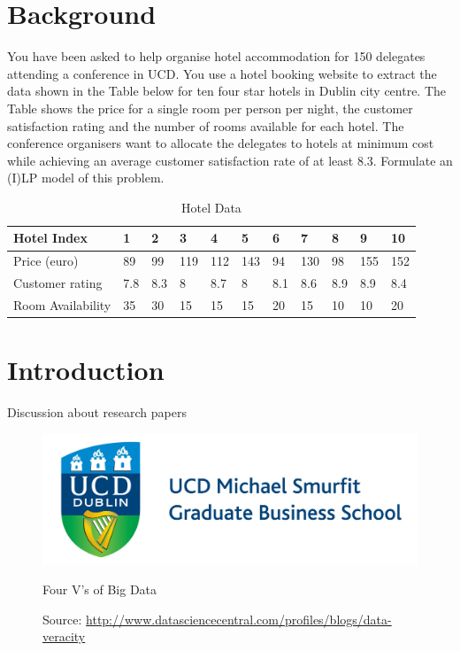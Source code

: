 \documentclass[paper=a4, fontsize=11pt]{scrartcl} %
\begin{document}
\section{Background}
You have been asked to help organise hotel accommodation for 150 delegates
attending a conference in UCD. You use a hotel booking website to extract the data
shown in the Table below for ten four star hotels in Dublin city centre. The Table
shows the price for a single room per person per night, the customer satisfaction
rating and the number of rooms available for each hotel. The conference organisers
want to allocate the delegates to hotels at minimum cost while achieving an average
customer satisfaction rate of at least 8.3. Formulate an (I)LP model of this problem. 

\begin{table}[ht]
\centering
\begin{tabular}{@{}|l|l|l|l|l|l|l|l|l|l|l|@{}}
\toprule
Hotel Index       & 1   & 2   & 3   & 4   & 5   & 6   & 7   & 8   & 9   & 10  \\ \midrule
Price (euro)     & 89  & 99  & 119 & 112 & 143 & 94  & 130 & 98  & 155 & 152 \\ \midrule
Customer rating   & 7.8 & 8.3 & 8   & 8.7 & 8   & 8.1 & 8.6 & 8.9 & 8.9 & 8.4 \\ \midrule
Room Availability & 35  & 30  & 15  & 15  & 15  & 20  & 15  & 10  & 10  & 20  \\ \bottomrule
\end{tabular}
\caption{Hotel Data}
\label{hoteldata}
\end{table}



\section{Introduction}

Discussion about research papers
\\
\begin{figure}[ht]
\centering
	\includegraphics[scale = 0.7]{logo.png} 
	\caption{Four V's of Big Data}
	\caption*{Source: \url{http://www.datasciencecentral.com/profiles/blogs/data-veracity}}	
\end{figure}
\end{document}

